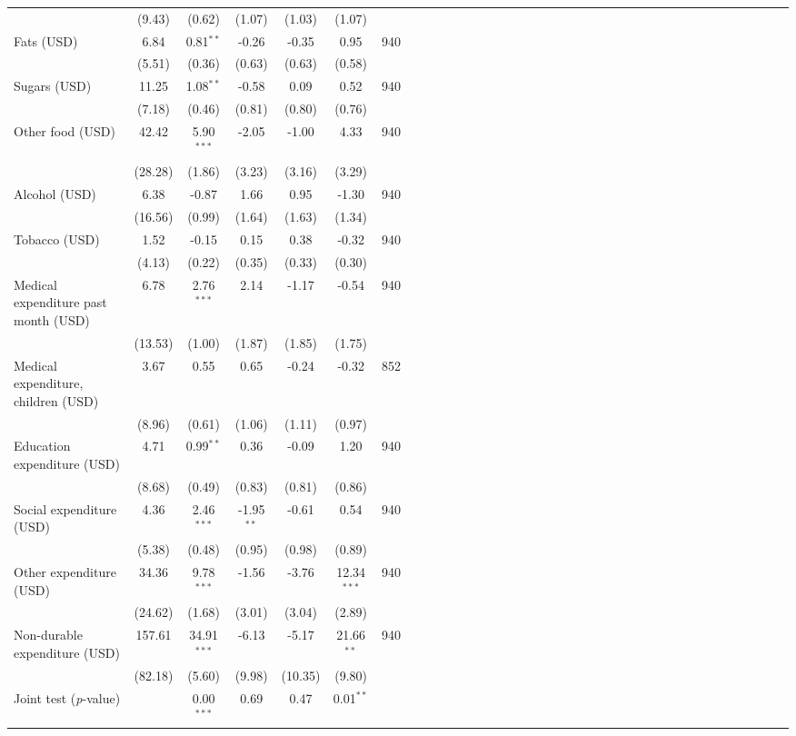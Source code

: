 {\begin{tabular}{l*{6}{SSSSSc}}
          &   (9.43)&   (0.62)&   (1.07)&   (1.03)&   (1.07)&         \\
\hspace{0.2cm}Fats (USD)&     6.84&0.81$^{**}$&    -0.26&    -0.35&     0.95&      940\\
          &   (5.51)&   (0.36)&   (0.63)&   (0.63)&   (0.58)&         \\
\hspace{0.2cm}Sugars (USD)&    11.25&1.08$^{**}$&    -0.58&     0.09&     0.52&      940\\
          &   (7.18)&   (0.46)&   (0.81)&   (0.80)&   (0.76)&         \\
\hspace{0.2cm}Other food (USD)&    42.42&5.90$^{***}$&    -2.05&    -1.00&     4.33&      940\\
          &  (28.28)&   (1.86)&   (3.23)&   (3.16)&   (3.29)&         \\
Alcohol (USD)&     6.38&    -0.87&     1.66&     0.95&    -1.30&      940\\
          &  (16.56)&   (0.99)&   (1.64)&   (1.63)&   (1.34)&         \\
Tobacco (USD)&     1.52&    -0.15&     0.15&     0.38&    -0.32&      940\\
          &   (4.13)&   (0.22)&   (0.35)&   (0.33)&   (0.30)&         \\
Medical expenditure past month (USD)&     6.78&2.76$^{***}$&     2.14&    -1.17&    -0.54&      940\\
          &  (13.53)&   (1.00)&   (1.87)&   (1.85)&   (1.75)&         \\
\hspace{0.2cm}Medical expenditure, children (USD)&     3.67&     0.55&     0.65&    -0.24&    -0.32&      852\\
          &   (8.96)&   (0.61)&   (1.06)&   (1.11)&   (0.97)&         \\
Education expenditure (USD)&     4.71&0.99$^{**}$&     0.36&    -0.09&     1.20&      940\\
          &   (8.68)&   (0.49)&   (0.83)&   (0.81)&   (0.86)&         \\
Social expenditure (USD)&     4.36&2.46$^{***}$&-1.95$^{**}$&    -0.61&     0.54&      940\\
          &   (5.38)&   (0.48)&   (0.95)&   (0.98)&   (0.89)&         \\
Other expenditure (USD)&    34.36&9.78$^{***}$&    -1.56&    -3.76&12.34$^{***}$&      940\\
          &  (24.62)&   (1.68)&   (3.01)&   (3.04)&   (2.89)&         \\
Non-durable expenditure (USD)&   157.61&34.91$^{***}$&    -6.13&    -5.17&21.66$^{**}$&      940\\
          &  (82.18)&   (5.60)&   (9.98)&  (10.35)&   (9.80)&         \\
\midrule Joint test (\emph{p}-value)&         &0.00$^{***}$&     0.69&     0.47&0.01$^{**}$&         \\
\bottomrule
\end{tabular}
}
